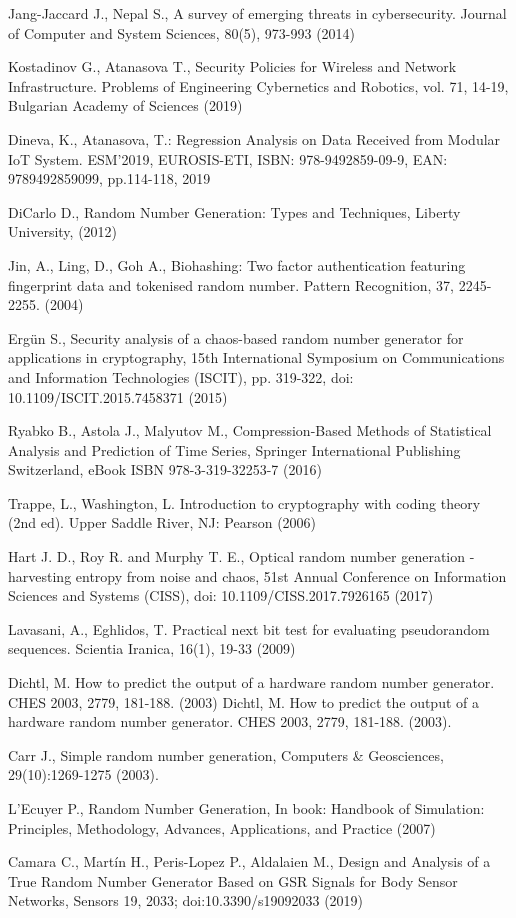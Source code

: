 \begin{thebibliography}{99.}
 Jang-Jaccard J., Nepal S., A survey of emerging threats in cybersecurity. Journal of Computer and System Sciences, 80(5), 973-993 (2014)

 Kostadinov G., Atanasova T., Security Policies for Wireless and Network Infrastructure. Problems of Engineering Cybernetics and Robotics, vol. 71, 14-19, Bulgarian Academy of Sciences (2019)

 Dineva, K., Atanasova, T.: Regression Analysis on Data Received from Modular IoT System. ESM’2019, EUROSIS-ETI, ISBN: 978-9492859-09-9, EAN: 9789492859099, pp.114-118, 2019

 DiCarlo D., Random Number Generation: Types and Techniques, Liberty University, (2012)

 Jin, A., Ling, D., Goh A., Biohashing: Two factor authentication featuring fingerprint data and tokenised random number. Pattern Recognition, 37, 2245- 2255. (2004)

 Ergün S., Security analysis of a chaos-based random number generator for applications in cryptography, 15th International Symposium on Communications and Information Technologies (ISCIT), pp. 319-322, doi: 10.1109/ISCIT.2015.7458371 (2015)

 Ryabko B., Astola J., Malyutov M., Compression-Based Methods of Statistical Analysis and Prediction of Time Series, Springer International Publishing Switzerland, eBook ISBN 978-3-319-32253-7 (2016)

 Trappe, L., Washington, L. Introduction to cryptography with coding theory (2nd ed). Upper Saddle River, NJ: Pearson (2006)

 Hart J. D., Roy R. and Murphy T. E., Optical random number generation - harvesting entropy from noise and chaos, 51st Annual Conference on Information Sciences and Systems (CISS), doi: 10.1109/CISS.2017.7926165 (2017)

 Lavasani, A., Eghlidos, T. Practical next bit test for evaluating pseudorandom sequences. Scientia Iranica, 16(1), 19-33 (2009)

 Dichtl, M. How to predict the output of a hardware random number generator. CHES 2003, 2779, 181-188. (2003) Dichtl, M. How to predict the output of a hardware random number generator. CHES 2003, 2779, 181-188. (2003).

 Carr J., Simple random number generation, Computers \& Geosciences, 29(10):1269-1275 (2003).

 L’Ecuyer P., Random Number Generation, In book: Handbook of Simulation: Principles, Methodology, Advances, Applications, and Practice (2007)

 Camara C., Martín H., Peris-Lopez P., Aldalaien M., Design and Analysis of a True Random Number Generator Based on GSR Signals for Body Sensor Networks, Sensors 19, 2033; doi:10.3390/s19092033 (2019)

\end{thebibliography}
